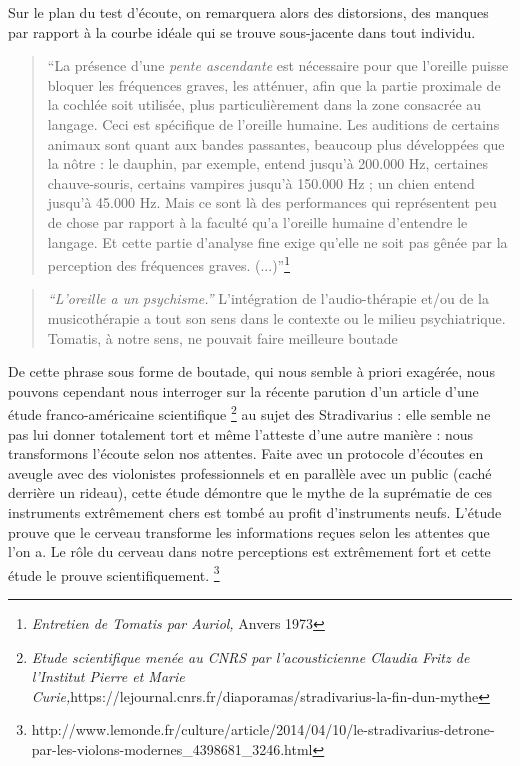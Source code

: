 Sur le plan du test d\textquoteright écoute,\emph{ }on remarquera
alors des distorsions, des manques\emph{ }par rapport à la courbe
idéale qui se trouve sous-jacente dans tout individu. 
\begin{quotation}
``La présence d'une \emph{pente ascendante} est nécessaire pour que
l'oreille puisse bloquer les fréquences graves, les atténuer, afin
que la partie proximale de la cochlée soit utilisée, plus particulièrement
dans la zone consacrée au langage. Ceci est spécifique de l'oreille
humaine. Les auditions de certains animaux sont quant aux bandes passantes,
beaucoup plus développées que la nôtre : le dauphin, par exemple,
entend jusqu\textquoteright à 200.000 Hz, certaines chauve-souris,
certains vampires jusqu'à 150.000 Hz ; un chien entend jusqu'à 45.000
Hz. Mais ce sont là des performances qui représentent peu de chose
par rapport à la faculté qu'a l'oreille humaine d\textquoteright entendre
le langage. Et cette partie d'analyse fine exige qu'elle ne soit pas
gênée par la perception des fréquences graves. (...)''\footnote{\emph{Entretien de Tomatis par Auriol,} Anvers 1973}
\end{quotation}
\begin{quote}
\emph{``L'oreille a un psychisme.''} 
L'intégration de l'audio-thérapie et/ou de la musicothérapie a tout son sens dans le contexte ou le milieu psychiatrique. Tomatis, à notre sens, ne pouvait faire meilleure boutade
\end{quote}
De cette phrase sous forme de boutade, qui nous semble à priori exagérée,
nous pouvons cependant nous interroger sur la récente parution d'un
article d'une étude franco-américaine scientifique \footnote{\emph{Etude scientifique menée au CNRS par l'acousticienne Claudia
Fritz de l'Institut Pierre et Marie Curie,}https://lejournal.cnrs.fr/diaporamas/stradivarius-la-fin-dun-mythe} au sujet des Stradivarius : elle semble ne pas lui donner totalement
tort et même l'atteste d'une autre manière : nous transformons l'écoute
selon nos attentes. Faite avec un protocole d'écoutes en aveugle avec
des violonistes professionnels et en parallèle avec un public (caché
derrière un rideau), cette étude démontre que le mythe de la suprématie
de ces instruments extrêmement chers est tombé au profit d'instruments
neufs. L'étude prouve que le cerveau transforme les informations reçues
selon les attentes que l'on a. Le rôle du cerveau dans notre perceptions
est extrêmement fort et cette étude le prouve scientifiquement. \footnote{http://www.lemonde.fr/culture/article/2014/04/10/le-stradivarius-detrone-par-les-violons-modernes\_4398681\_3246.html }

